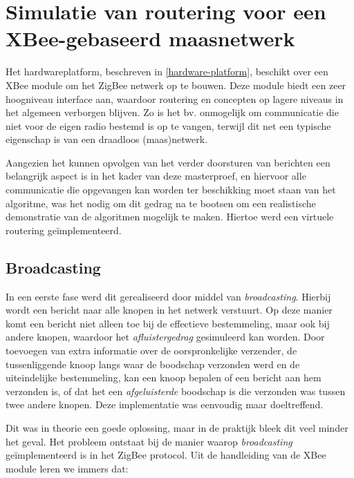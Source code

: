 
\chapter{Simulatie van routering voor een XBee-gebaseerd maasnetwerk}
\label{virtual-mesh}

Het hardwareplatform, beschreven in \ref{hardware-platform}, beschikt over een
XBee module om het ZigBee netwerk op te bouwen. Deze module biedt een zeer
hoogniveau interface aan, waardoor routering en concepten op lagere niveaus in
het algemeen verborgen blijven. Zo is het bv. onmogelijk om communicatie die
niet voor de eigen radio bestemd is op te vangen, terwijl dit net een typische
eigenschap is van een draadloos (maas)netwerk.

Aangezien het kunnen opvolgen van het verder doorsturen van berichten een
belangrijk aspect is in het kader van deze masterproef, en hiervoor alle
communicatie die opgevangen kan worden ter beschikking moet staan van het
algoritme, was het nodig om dit gedrag na te bootsen om een realistische
demonstratie van de algoritmen mogelijk te maken. Hiertoe werd een virtuele
routering ge\"implementeerd.

\section{Broadcasting}
\label{zigbee-broadcasting}

In een eerste fase werd dit gerealiseerd door middel van \emph{broadcasting}.
Hierbij wordt een bericht naar alle knopen in het netwerk verstuurt. Op deze
manier komt een bericht niet alleen toe bij de effectieve bestemmeling, maar
ook bij andere knopen, waardoor het \emph{afluistergedrag} gesimuleerd kan
worden. Door toevoegen van extra informatie over de oorspronkelijke verzender,
de tussenliggende knoop langs waar de boodschap verzonden werd en de
uiteindelijke bestemmeling, kan een knoop bepalen of een bericht aan hem
verzonden is, of dat het een \emph{afgeluisterde} boodschap is die verzonden
was tussen twee andere knopen. Deze implementatie was eenvoudig maar
doeltreffend.

Dit was in theorie een goede oplossing, maar in de praktijk bleek dit veel
minder het geval. Het probleem ontstaat bij de manier waarop
\emph{broadcasting} ge\"implementeerd is in het ZigBee protocol. Uit de
handleiding van de XBee module \citep{manual:xbee} leren we immers dat:

